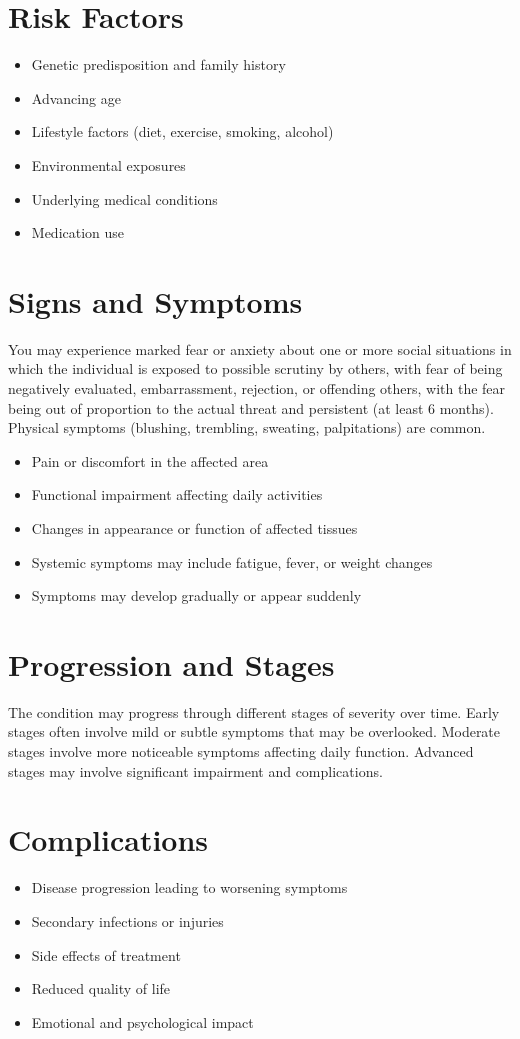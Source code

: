 \section{Risk Factors}
\begin{itemize}[noitemsep]
  \item Genetic predisposition and family history
  \item Advancing age
  \item Lifestyle factors (diet, exercise, smoking, alcohol)
  \item Environmental exposures
  \item Underlying medical conditions
  \item Medication use
\end{itemize}
\section{Signs and Symptoms}
You may experience marked fear or anxiety about one or more social situations in which the individual is exposed to possible scrutiny by others, with fear of being negatively evaluated, embarrassment, rejection, or offending others, with the fear being out of proportion to the actual threat and persistent (at least 6 months). Physical symptoms (blushing, trembling, sweating, palpitations) are common.

\begin{itemize}[noitemsep]
  \item Pain or discomfort in the affected area
  \item Functional impairment affecting daily activities
  \item Changes in appearance or function of affected tissues
  \item Systemic symptoms may include fatigue, fever, or weight changes
  \item Symptoms may develop gradually or appear suddenly
\end{itemize}
\section{Progression and Stages}
The condition may progress through different stages of severity over time. Early stages often involve mild or subtle symptoms that may be overlooked. Moderate stages involve more noticeable symptoms affecting daily function. Advanced stages may involve significant impairment and complications.
\section{Complications}
\begin{itemize}[noitemsep]
  \item Disease progression leading to worsening symptoms
  \item Secondary infections or injuries
  \item Side effects of treatment
  \item Reduced quality of life
  \item Emotional and psychological impact
\end{itemize}
